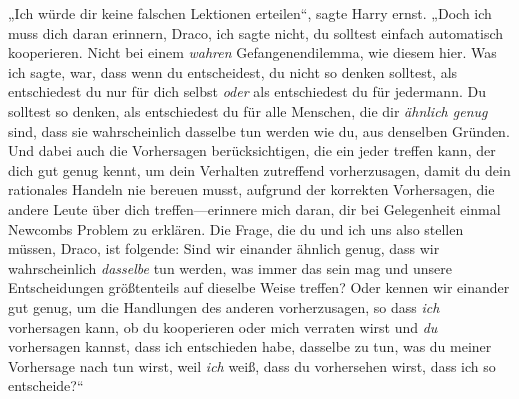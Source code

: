 „Ich würde dir keine falschen Lektionen erteilen“, sagte Harry ernst. „Doch ich muss dich daran erinnern, Draco, ich sagte nicht, du solltest einfach automatisch kooperieren. Nicht bei einem \emph{wahren} Gefangenendilemma, wie diesem hier. Was ich sagte, war, dass wenn du entscheidest, du nicht so denken solltest, als entschiedest du nur für dich selbst \emph{oder} als entschiedest du für jedermann. Du solltest so denken, als entschiedest du für alle Menschen, die dir \emph{ähnlich genug} sind, dass sie wahrscheinlich dasselbe tun werden wie du, aus denselben Gründen. Und dabei auch die Vorhersagen berücksichtigen, die ein jeder treffen kann, der dich gut genug kennt, um dein Verhalten zutreffend vorherzusagen, damit du dein rationales Handeln nie bereuen musst, aufgrund der korrekten Vorhersagen, die andere Leute über dich treffen—erinnere mich daran, dir bei Gelegenheit einmal Newcombs Problem zu erklären. Die Frage, die du und ich uns also stellen müssen, Draco, ist folgende: Sind wir einander ähnlich genug, dass wir wahrscheinlich \emph{dasselbe} tun werden, was immer das sein mag und unsere Entscheidungen größtenteils auf dieselbe Weise treffen? Oder kennen wir einander gut genug, um die Handlungen des anderen vorherzusagen, so dass \emph{ich} vorhersagen kann, ob du kooperieren oder mich verraten wirst und \emph{du} vorhersagen kannst, dass ich entschieden habe, dasselbe zu tun, was du meiner Vorhersage nach tun wirst, weil \emph{ich} weiß, dass du vorhersehen wirst, dass ich so entscheide?“

